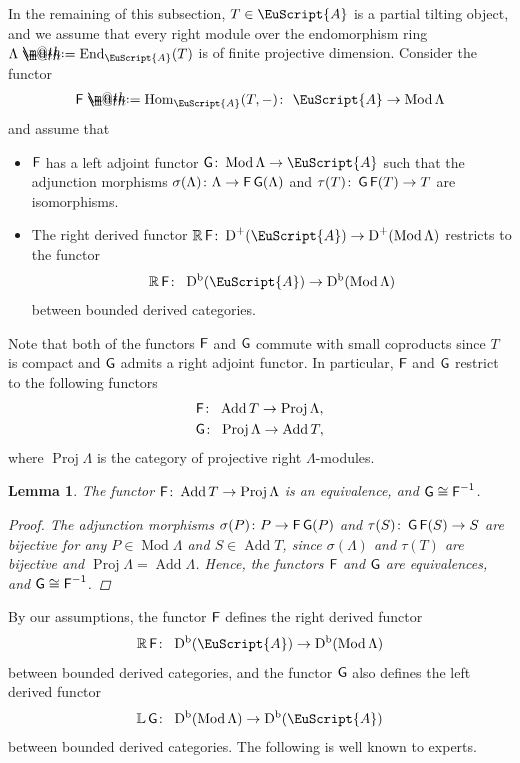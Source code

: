 \documentclass[10pt,a4paper]{amsart}
\makeatletter
\newtheorem{lem}[dfn]{Lemma}
\newcommand*{\defeq}{\mathrel{\rlap{%
 \raisebox{0.3ex}{$\m@th\cdot$}}%
 \raisebox{-0.3ex}{$\m@th\cdot$}}%
 =}
\numberwithin{equation}{section}
\newcommand{\Hom}{\operatorname{Hom}}
\newcommand{\End}{\operatorname{End}}
\newcommand{\Mod}{\operatorname{Mod}}
\newcommand{\Proj}{\operatorname{Proj}}
\newcommand{\Add}{\operatorname{Add}}
\newcommand{\Db}{\operatorname{D^b}}
\newcommand{\D}{\operatorname{D}}
\newcommand{\bL}{\mathbb{L}}
\newcommand{\bR}{\mathbb{R}}
\newcommand{\scrA}{\EuScript{A}}
\newcommand{\F}{\operatorname{\sf{F}}}
\newcommand{\G}{\operatorname{\sf{G}}}
\makeatother
\begin{document}
In the remaining of this subsection, $T\in\scrA$ is a partial tilting object, and we assume that every right module over the endomorphism ring $\Lambda\defeq\End_{\scrA}(T)$ is of finite projective dimension. Consider the functor
 \begin{gather*}
{\F}\defeq\Hom_{\scrA}(T,-)\colon\ \scrA\to\Mod\Lambda
 \end{gather*}
and assume that
\begin{itemize}\itemsep=0pt
 \item[$(i)$] $\F$ has a left adjoint functor $\G\colon\Mod\Lambda\to \scrA$ such that the adjunction morphisms $\sigma({\Lambda})\colon \Lambda\to \F\G(\Lambda)$ and $\tau(T)\colon \G\F(T)\to T$ are isomorphisms.

 \item[$(ii)$] The right derived functor $\bR \F\colon \D^+(\scrA)\to \D^+(\Mod\Lambda)$ restricts to the functor
\begin{gather*}
 \bR \F\colon\ \Db(\scrA)\to \Db(\Mod\Lambda)
 \end{gather*}
 between bounded derived categories.
 \end{itemize}

 Note that both of the functors $\F$ and $\G$ commute with small coproducts since $T$ is compact and $\G$ admits a right adjoint functor. In particular, $\F$ and $\G$ restrict to the following functors
 \begin{gather*}
 \F\colon\ \Add T\to\Proj\Lambda,
 \\
\G\colon\ \Proj\Lambda\to \Add T,
 \end{gather*}
where $\Proj \Lambda$ is the category of projective right $\Lambda$-modules.
\begin{lem}\label{add proj}
The functor $\F\colon\Add T\to\Proj\Lambda$ is an equivalence, and $\G\cong \F^{-1}$.
\begin{proof}
The adjunction morphisms $\sigma({P})\colon P\to \F\G(P)$ and $\tau(S)\colon \G\F(S)\to S$ are bijective for any $P\in\Mod\Lambda$ and $S\in \Add T$, since $\sigma({\Lambda})$ and $\tau({T})$ are bijective and $\Proj \Lambda=\Add \Lambda$. Hence, the functors $\F$ and $\G$ are equivalences, and $\G\cong \F^{-1}$.
\end{proof}
\end{lem}

By our assumptions, the functor $\F$ defines the right derived functor
\begin{gather*}
\bR\F\colon\ \Db(\scrA)\to \Db(\Mod\Lambda)
\end{gather*}
between bounded derived categories, and the functor $\G$ also defines the left derived functor
\begin{gather*}
\bL\G\colon\ \Db(\Mod\Lambda)\to\Db(\scrA)
\end{gather*}
between bounded derived categories.
The following is well known to experts.
\end{document}
